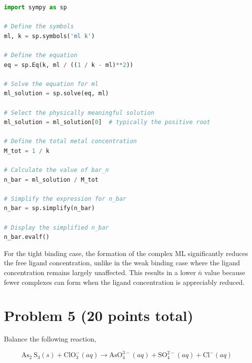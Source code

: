 \documentclass[12pt]{article}
\begin{document}
\begin{lstlisting}[language=Python]
import sympy as sp

# Define the symbols
ml, k = sp.symbols('ml k')

# Define the equation
eq = sp.Eq(k, ml / ((1 / k - ml)**2))

# Solve the equation for ml
ml_solution = sp.solve(eq, ml)

# Select the physically meaningful solution
ml_solution = ml_solution[0]  # typically the positive root

# Define the total metal concentration
M_tot = 1 / k

# Calculate the value of bar_n
n_bar = ml_solution / M_tot

# Simplify the expression for n_bar
n_bar = sp.simplify(n_bar)

# Display the simplified n_bar
n_bar.evalf()

\end{lstlisting}
For the tight binding case, the formation of the complex ML significantly reduces the free ligand concentration, unlike in the weak binding case where the ligand concentration remains largely unaffected. This results in a lower 
$\bar{n}$
 value because fewer complexes can form when the ligand concentration is appreciably reduced.
\section{Problem 5 (20 points total)}
Balance the following reaction,

$$
\mathrm{As}_{2} \mathrm{~S}_{3}(s)+\mathrm{ClO}_{3}^{-}(a q) \rightarrow \mathrm{AsO}_{4}^{3-}(a q)+\mathrm{SO}_{4}^{2-}(a q)+\mathrm{Cl}^{-}(a q)
$$
\end{document}
